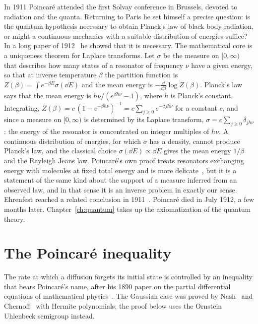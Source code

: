 In 1911 Poincar\'e attended the first Solvay conference in Brussels, devoted to radiation and the quanta. Returning to Paris he set himself a precise question: is the quantum hypothesis necessary to obtain Planck's law of black body radiation, or might a continuous mechanics with a suitable distribution of energies suffice? In a long paper of 1912~\cite{poincare1912quanta} he showed that it is necessary. The mathematical core is a uniqueness theorem for Laplace transforms. Let $\sigma$ be the measure on $[0,\infty)$ that describes how many states of a resonator of frequency $\nu$ have a given energy, so that at inverse temperature $\beta$ the partition function is $Z(\beta)=\int e^{-\beta E}\sigma(\dd E)$ and the mean energy is $-\frac{\dd}{\dd\beta}\log Z(\beta)$. Planck's law says that the mean energy is $h\nu/(e^{\beta h\nu}-1)$, where $h$ is Planck's constant. Integrating, $Z(\beta)=c\,(1-e^{-\beta h\nu})^{-1}=c\sum_{j\geq0}e^{-\beta jh\nu}$ for a constant $c$, and since a measure on $[0,\infty)$ is determined by its Laplace transform, $\sigma=c\sum_{j\geq0}\delta_{jh\nu}$: the energy of the resonator is concentrated on integer multiples of $h\nu$. A continuous distribution of energies, for which $\sigma$ has a density, cannot produce Planck's law, and the classical choice $\sigma(\dd E)\propto\dd E$ gives the mean energy $1/\beta$ and the Rayleigh Jeans law. Poincar\'e's own proof treats resonators exchanging energy with molecules at fixed total energy and is more delicate~\cite{prentis1995,mccormmach1967}, but it is a statement of the same kind about the support of a measure inferred from an observed law, and in that sense it is an inverse problem in exactly our sense. Ehrenfest reached a related conclusion in 1911~\cite{ehrenfest1911quanta}. Poincar\'e died in July 1912, a few months later. Chapter~\ref{ch:quantum} takes up the axiomatization of the quantum theory.

\section{The Poincar\'e inequality}

The rate at which a diffusion forgets its initial state is controlled by an inequality that bears Poincar\'e's name, after his 1890 paper on the partial differential equations of mathematical physics~\cite{poincare1890b}. The Gaussian case was proved by Nash~\cite{nash1958} and Chernoff~\cite{chernoff1981} with Hermite polynomials; the proof below uses the Ornstein Uhlenbeck semigroup instead.

